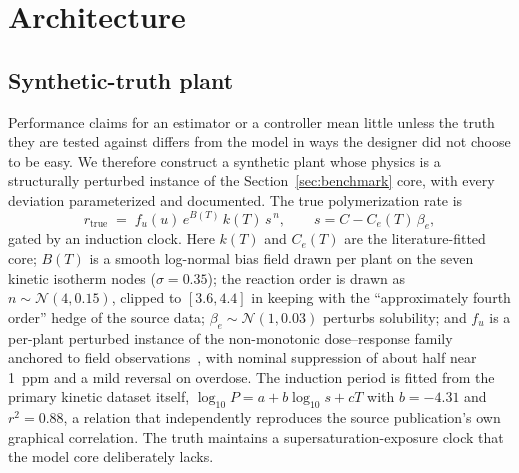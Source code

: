 \section{Architecture}\label{sec:arch}

\subsection{Synthetic-truth plant}\label{sec:plant}

Performance claims for an estimator or a controller mean little unless
the truth they are tested against differs from the model in ways the
designer did not choose to be easy. We therefore construct a synthetic
plant whose physics is a structurally perturbed instance of the
Section~\ref{sec:benchmark} core, with every deviation parameterized
and documented. The true polymerization rate is
\begin{equation}\label{eq:truth}
r_{\mathrm{true}} \;=\; f_u(u)\, e^{B(T)}\, k(T)\, s^{\,n},
\qquad s = C - C_e(T)\,\beta_e ,
\end{equation}
gated by an induction clock. Here $k(T)$ and $C_e(T)$ are the
literature-fitted core; $B(T)$ is a smooth log-normal bias field drawn
per plant on the seven kinetic isotherm nodes ($\sigma = 0.35$); the
reaction order is drawn as $n \sim \mathcal{N}(4, 0.15)$, clipped to
$[3.6, 4.4]$ in keeping with the ``approximately fourth order'' hedge
of the source data; $\beta_e \sim \mathcal{N}(1, 0.03)$ perturbs
solubility; and $f_u$ is a per-plant perturbed instance of the
non-monotonic dose--response family anchored to field
observations~\citep{gallup2002investigations}, with nominal suppression
of about half near 1~ppm and a mild reversal on overdose. The induction
period is fitted from the primary kinetic dataset itself,
$\log_{10} P = a + b \log_{10} s + cT$ with $b = -4.31$ and
$r^2 = 0.88$, a relation that independently reproduces the source
publication's own graphical correlation. The truth maintains a
supersaturation-exposure clock that the model core deliberately lacks.

